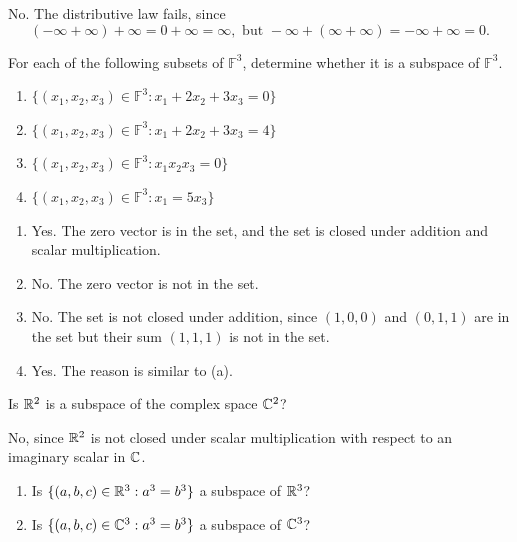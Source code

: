 \documentclass{article}
\begin{document}
\begin{solution}
No. The distributive law fails, since
\[ (-\infty+\infty)+\infty= 0+\infty = \infty,\text{ but } -\infty+(\infty+\infty) = -\infty+\infty = 0. \]
\end{solution}

\begin{problem}[1C-1]
For each of the following subsets of $\mathbb{F}^3$, determine whether it is a subspace of $\mathbb{F}^3$.

\begin{enumerate}[label=(\alph*)]
    \item $\{ (x_1, x_2, x_3) \in \mathbb{F}^3 : x_1 + 2x_2 + 3x_3 = 0 \}$
    \item $\{ (x_1, x_2, x_3) \in \mathbb{F}^3 : x_1 + 2x_2 + 3x_3 = 4 \}$
    \item $\{ (x_1, x_2, x_3) \in \mathbb{F}^3 : x_1 x_2 x_3 = 0 \}$
    \item $\{ (x_1, x_2, x_3) \in \mathbb{F}^3 : x_1 = 5x_3 \}$
\end{enumerate}
\end{problem}

\begin{solution}
\begin{enumerate}[label=(\alph*)]
    \item Yes. The zero vector is in the set, and the set is closed under addition and scalar multiplication.
    \item No. The zero vector is not in the set.
    \item No. The set is not closed under addition, since $ (1, 0, 0) $ and $ (0, 1, 1) $ are in the set but their sum $ (1, 1, 1) $ is not in the set.
    \item Yes. The reason is similar to (a).
\end{enumerate}
\end{solution}

\begin{problem}[1C-5]
Is $ \mathbb{R}^2 $ is a subspace of the complex space $ \mathbb{C}^2 $?
\end{problem}

\begin{solution}
No, since \(\mathbb{R}^2\) is not closed under scalar multiplication with respect to an imaginary scalar in \(\mathbb{C}\).
\end{solution}

\begin{problem}[1C-6]
\begin{enumerate}[label=(\alph*)]
    \item Is $\{(a, b, c) \in \mathbb{R}^3 : a^3 = b^3\}$ a subspace of $\mathbb{R}^3$?
    \item Is $\{(a, b, c) \in \mathbb{C}^3 : a^3 = b^3\}$ a subspace of $\mathbb{C}^3$?
\end{enumerate}
\end{problem}
\end{document}
